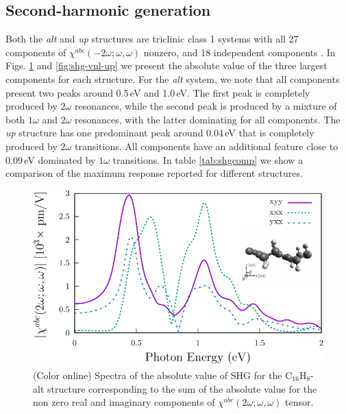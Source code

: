 \documentclass[pss]{wiley2sp} %
\begin{document}
\subsection{Second-harmonic generation}
Both the \emph{alt} and \emph{up} structures are triclinic class 1 systems
with all 27 components of $\chi^{abc}(-2\omega;\omega,\omega)$ nonzero, and 18
independent components \cite{popovbook}. In Figs. \ref{fig:shg-vnl-alt} and
\ref{fig:shg-vnl-up} we present the absolute value of the three largest
components for each structure. For the \emph{alt} system, we note that all
components present two peaks around 0.5\,eV and 1.0\,eV. The first peak is
completely produced by $2\omega$ resonances, while the second peak is produced
by a mixture of both $1\omega$ and $2\omega$ resonances, with the latter
dominating for all components. The \emph{up} structure  has one predominant
peak around 0.04\,eV that is completely produced by $2\omega$ transitions. All
components have an additional feature close to 0.09\,eV dominated by $1\omega$
transitions. In table \ref{tab:shgcomp} we show a comparison of the maximum
response reported for different structures.

\begin{figure}[t]
\includegraphics[width=\linewidth]{figures/shg-vnl-alt}
\caption{(Color online) Spectra of the absolute value of SHG for the
C$_{16}$H$_{8}$-alt structure corresponding to the sum of the absolute value
for the non zero real and imaginary components of
$\chi^{abc}(2\omega;\omega,\omega) $ tensor.\label{fig:shg-vnl-alt}}
\end{figure}
\end{document}
